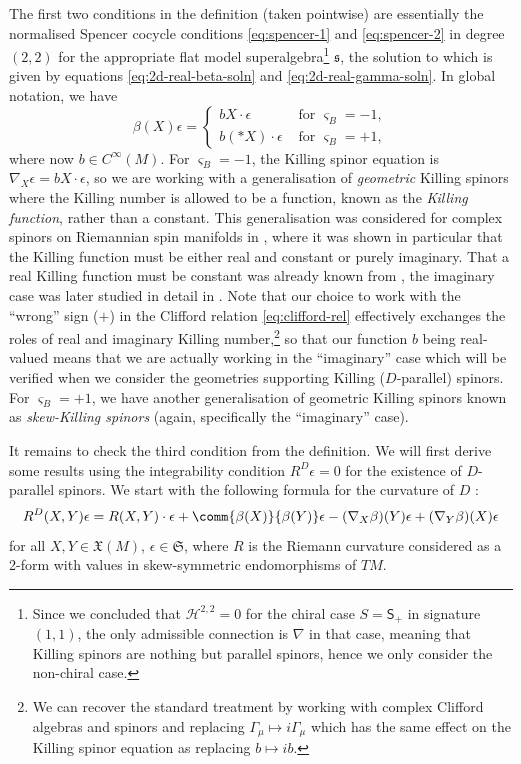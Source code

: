 \documentclass[10pt,a4paper]{amsart}
\numberwithin{equation}{section}
\newcommand{\fs}{\mathfrak{s}}
\newcommand{\fX}{\mathfrak{X}}
\newcommand{\fS}{\mathfrak{S}}
\newcommand{\cH}{\mathcal{H}}
\newcommand{\ssS}{\mathsf{S}}
\newcommand{\1}{\mathbbm{1}}
\begin{document}
The first two conditions in the definition (taken pointwise) are essentially the normalised Spencer cocycle conditions \eqref{eq:spencer-1} and \eqref{eq:spencer-2} in degree $(2,2)$ for the appropriate flat model superalgebra\footnote{Since we concluded that $\cH^{2,2}=0$ for the chiral case $S=\ssS_+$ in signature $(1,1)$, the only admissible connection is $\nabla$ in that case, meaning that Killing spinors are nothing but parallel spinors, hence we only consider the non-chiral case.} $\fs$, the solution to which is given by equations \eqref{eq:2d-real-beta-soln} and \eqref{eq:2d-real-gamma-soln}. In global notation, we have
\begin{equation}\label{eq:2d-real-beta}
	\beta(X) \epsilon = \begin{cases}
		b X\cdot \epsilon	& \text{ for } \varsigma_B = -1,\\
		b (*X)\cdot\epsilon	& \text{ for } \varsigma_B = +1,
	\end{cases}
\end{equation}
where now $b\in C^\infty(M)$. For $\varsigma_B=-1$, the Killing spinor equation is $\nabla_X\epsilon = b X\cdot\epsilon$, so we are working with a generalisation of \emph{geometric} Killing spinors where the Killing number is allowed to be a function, known as the \emph{Killing function}, rather than a constant. This generalisation was considered for complex spinors on Riemannian spin manifolds in \cite{Lichnerowicz1987}, where it was shown in particular that the Killing function must be either real and constant or purely imaginary. That a real Killing function must be constant was already known from \cite{Hijazi1986}, the imaginary case was later studied in detail in \cite{Rademacher1990}. Note that our choice to work with the ``wrong'' sign ($+$) in the Clifford relation \eqref{eq:clifford-rel} effectively exchanges the roles of real and imaginary Killing number,\footnote{We can recover the standard treatment by working with complex Clifford algebras and spinors and replacing $\Gamma_\mu\mapsto i\Gamma_\mu$ which has the same effect on the Killing spinor equation as replacing $b\mapsto ib$.} so that our function $b$ being real-valued means that we are actually working in the ``imaginary'' case which will be verified when we consider the geometries supporting Killing ($D$-parallel) spinors. For $\varsigma_B=+1$, we have another generalisation of geometric Killing spinors known as \emph{skew-Killing spinors} \cite{Habib2012} (again, specifically the ``imaginary'' case).

 It remains to check the third condition from the definition. We will first derive some results using the integrability condition $R^D\epsilon=0$ for the existence of $D$-parallel spinors. We start with the following formula for the curvature of $D$ \cite[equation~(3.2)]{Beckett2024_2}:
\[%
	R^D(X,Y)\epsilon = R(X,Y)\cdot\epsilon + \comm{\beta(X)}{\beta(Y)}\epsilon - (\nabla_X\beta)(Y)\epsilon + (\nabla_Y\beta)(X)\epsilon
\]
for all $X,Y\in\fX(M)$, $\epsilon\in\fS$, where $R$ is the Riemann curvature considered as a 2-form with values in skew-symmetric endomorphisms of $TM$.
\end{document}
